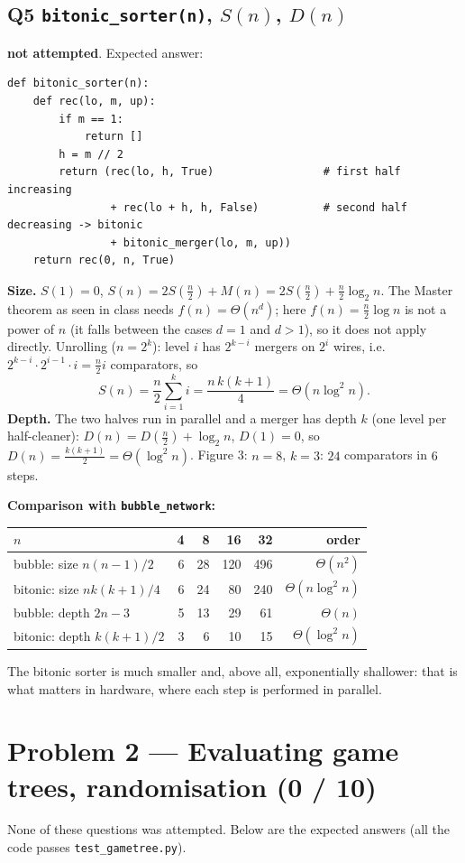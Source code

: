 \documentclass[11pt,a4paper]{article}
\newcommand{\pts}[3]{\fcolorbox{#3}{white}{\color{#3}\textbf{#1\,/\,#2}}}
\newcommand{\NONE}{\textcolor{none}{\textbf{not attempted}}}
\begin{document}
\subsection*{Q5 \quad \texttt{bitonic\_sorter(n)}, $S(n)$, $D(n)$ \hfill \pts{0}{2}{none}}
\NONE. Expected answer:
\begin{lstlisting}
def bitonic_sorter(n):
    def rec(lo, m, up):
        if m == 1:
            return []
        h = m // 2
        return (rec(lo, h, True)                 # first half increasing
                + rec(lo + h, h, False)          # second half decreasing -> bitonic
                + bitonic_merger(lo, m, up))
    return rec(0, n, True)
\end{lstlisting}
\textbf{Size.} $S(1)=0$, $S(n)=2S(\frac n2)+M(n)=2S(\frac n2)+\frac n2\log_2 n$. The Master theorem
as seen in class needs $f(n)=\Theta(n^d)$; here $f(n)=\frac n2\log n$ is not a power of $n$ (it falls
between the cases $d=1$ and $d>1$), so it does not apply directly. Unrolling ($n=2^k$): level $i$
has $2^{k-i}$ mergers on $2^i$ wires, i.e.\ $2^{k-i}\cdot2^{i-1}\cdot i=\frac n2 i$ comparators, so
\[
S(n)=\frac n2\sum_{i=1}^{k} i=\frac{n\,k(k+1)}{4}=\Theta(n\log^2 n).
\]
\textbf{Depth.} The two halves run in parallel and a merger has depth $k$ (one level per
half-cleaner): $D(n)=D(\frac n2)+\log_2 n$, $D(1)=0$, so $D(n)=\frac{k(k+1)}2=\Theta(\log^2 n)$.
Figure 3: $n=8$, $k=3$: $24$ comparators in $6$ steps.

\textbf{Comparison with \texttt{bubble\_network}:}
\begin{center}\small
\begin{tabular}{lrrrrr}
\toprule
$n$ & 4 & 8 & 16 & 32 & order\\
\midrule
bubble: size $n(n-1)/2$ & 6 & 28 & 120 & 496 & $\Theta(n^2)$\\
bitonic: size $nk(k+1)/4$ & 6 & 24 & 80 & 240 & $\Theta(n\log^2 n)$\\
bubble: depth $2n-3$ & 5 & 13 & 29 & 61 & $\Theta(n)$\\
bitonic: depth $k(k+1)/2$ & 3 & 6 & 10 & 15 & $\Theta(\log^2 n)$\\
\bottomrule
\end{tabular}
\end{center}
The bitonic sorter is much smaller and, above all, exponentially shallower: that is what matters in
hardware, where each step is performed in parallel.

\newpage
\section{Problem 2 --- Evaluating game trees, randomisation (0 / 10)}
None of these questions was attempted. Below are the expected answers (all the code passes
\texttt{test\_gametree.py}).
\end{document}
